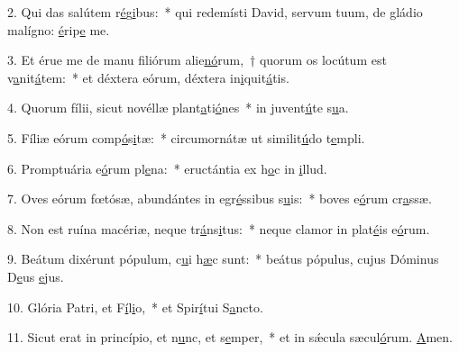 2. Qui das salútem r\uline{é}g\uline{i}bus:~* qui redemísti David, servum tuum, de gládio malígno: \uline{é}rip\uline{e} me.\par 
3. Et érue me de manu filiórum alie\uline{nó}rum,~† quorum os locútum est v\uline{a}nit\uline{á}tem:~* et déxtera eórum, déxtera in\uline{i}quit\uline{á}tis.\par 
4. Quorum fílii, sicut novéllæ plant\uline{a}ti\uline{ó}nes~* in juvent\uline{ú}te s\uline{u}a.\par 
5. Fíliæ eórum comp\uline{ó}s\uline{i}tæ:~* circumornátæ ut similit\uline{ú}do t\uline{e}mpli.\par 
6. Promptuária e\uline{ó}rum pl\uline{e}na:~* eructántia ex h\uline{o}c in \uline{i}llud.\par 
7. Oves eórum fœtósæ, abundántes in egr\uline{é}ssibus s\uline{u}is:~* boves e\uline{ó}rum cr\uline{a}ssæ.\par 
8. Non est ruína macériæ, neque tr\uline{á}ns\uline{i}tus:~* neque clamor in plat\uline{é}is e\uline{ó}rum.\par 
9. Beátum dixérunt pópulum, c\uline{u}i h\uline{æ}c sunt:~* beátus pópulus, cujus Dóminus D\uline{e}us \uline{e}jus.\par 
10. Glória Patri, et F\uline{í}l\uline{i}o,~* et Spir\uline{í}tui S\uline{a}ncto.\par 
11. Sicut erat in princípio, et n\uline{u}nc, et s\uline{e}mper,~* et in sǽcula sæcul\uline{ó}rum. \uline{A}men.\par 
